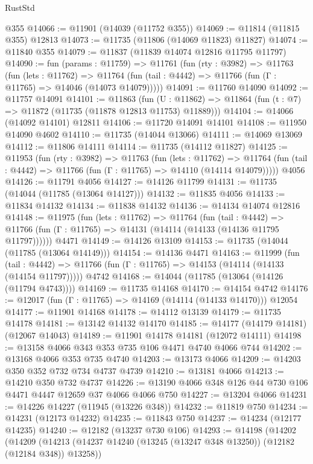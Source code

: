 \begin{lexlean}{RustStd}
\begin{coremodule}
{\begin{coremodule}
{{{{{{{{{{{{{{{{{{{{{{{{{{{{{{{{{{{{{{{{{{{{{{{{{{{{{{{{{{{{{{{{{{{{    @355
@14066 := @11901 (@14039 (@11752 @355))
@14069 := @11814 (@11815 @355) @12813
@14073 := @11735 (@11806 (@14069 @11823) @11827)
@14074 := @11840 @355
@14079 := @11837 (@11839 @14074 @12816 @11795 @11797)
@14090 := fun (params : @11759) =>
  @11761
    (fun (rty : @3982) =>
    @11763
      (fun (lets : @11762) =>
      @11764 (fun (tail : @4442) => @11766 (fun (Γ : @11765) => @14046 (@14073 @14079)))))
@14091 := @11760 @14090
@14092 := @11757 @14091
@14101 := @11863
    (fun (U : @11862) => @11864 (fun (t : @7) => @11872 (@11735 (@11878 @12813 @11753) @11889)))
@14104 := @14066 (@14092 @14101) @12811
@14106 := @11720 @14091 @14101
@14108 := @11950 @14090 @4602
@14110 := @11735 (@14044 @13066)
@14111 := @14069 @13069
@14112 := @11806 @14111
@14114 := @11735 (@14112 @11827)
@14125 := @11953
    (fun (rty : @3982) =>
    @11763
      (fun (lets : @11762) =>
      @11764 (fun (tail : @4442) => @11766 (fun (Γ : @11765) => @14110 (@14114 @14079)))))
    @4056
@14126 := @11791 @4056
@14127 := @14126 @11799
@14131 := @11735 (@14044 (@11785 (@13064 @14127)))
@14132 := @11835 @4056
@14133 := @11834 @14132
@14134 := @11838 @14132
@14136 := @14134 @14074 @12816
@14148 := @11975
    (fun (lets : @11762) =>
    @11764
      (fun (tail : @4442) =>
      @11766 (fun (Γ : @11765) => @14131 (@14114 (@14133 (@14136 @11795 @11797))))))
    @4471
@14149 := @14126 @13109
@14153 := @11735 (@14044 (@11785 (@13064 @14149)))
@14154 := @14136 @4471
@14163 := @11999
    (fun (tail : @4442) => @11766 (fun (Γ : @11765) => @14153 (@14114 (@14133 (@14154 @11797)))))
    @4742
@14168 := @14044 (@11785 (@13064 (@14126 (@11794 @4743))))
@14169 := @11735 @14168
@14170 := @14154 @4742
@14176 := @12017 (fun (Γ : @11765) => @14169 (@14114 (@14133 @14170))) @12054
@14177 := @11901 @14168
@14178 := @14112 @13139
@14179 := @11735 @14178
@14181 := @13142 @14132 @14170
@14185 := @14177 (@14179 @14181) (@12067 @14043)
@14189 := @11901 @14178 @14181 (@12072 @14111)
@14198 := @13158 @4066 @343 @353 @735 @106 @4471 @4740 @4066 @744
@14202 := @13168 @4066 @353 @735 @4740
@14203 := @13173 @4066
@14209 := @14203 @350 @352 @732 @734 @4737 @4739
@14210 := @13181 @4066
@14213 := @14210 @350 @732 @4737
@14226 := @13190 @4066 @348 @126 @44 @730 @106 @4471 @4447 @12659 @37 @4066 @4066 @750
@14227 := @13204 @4066
@14231 := @14226 @14227 (@11945 (@13226 @348))
@14232 := @11819 @750
@14234 := @14231 (@12173 @14232)
@14235 := @11843 @750
@14237 := @14234 (@12177 @14235)
@14240 := @12182 (@13237 @730 @106)
@14293 := @14198
    (@14202
      (@14209
        (@14213 (@14237 @14240 (@13245 (@13247 @348 @13250)) (@12182 (@12184 @348)) @13258))
}}}}}}}}}}}}}}}}}}}}}}}}}}}}}}}}}}}}}}}}}}}}}}}}}}}}}}}}}}}}}}}}}}}}
\end{coremodule}}
\end{coremodule}
\end{lexlean}
